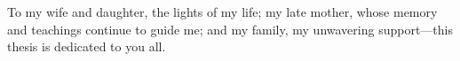 \documentclass[a4paper, 10pt, twoside]{book}
\newenvironment{dedication}
  {
   \clearpage            %
   \thispagestyle{empty} %
   \vspace*{\stretch{1}} %
   \itshape              %
   \centering            %
  }
  {
   \par                  %
   \vspace{\stretch{3}}  %
   \clearpage            %
  }
\newenvironment{mygreek}
  {\clearpage
   \thispagestyle{empty}
   \vspace*{\stretch{1}}
   \itshape
   \raggedleft}
  {\par
   \vspace{\stretch{3}}
   \clearpage}
\begin{document}
    \begin{dedication}
        To my wife and daughter, the lights of my life; my late mother, whose memory and teachings continue to guide me; and my family, my unwavering support---this thesis is dedicated to you all.
    \end{dedication}

    \newpage  %
    \mbox{}
    \thispagestyle{empty}

    
        



    
    
    \newpage  %
    \mbox{}
    \thispagestyle{empty}

    
    
\end{document}
